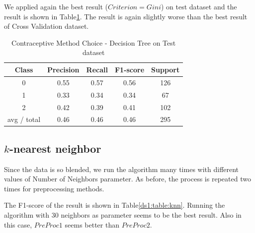 We applied again the best result ($Criterion=Gini$) on test dataset and the result is shown in Table\ref{ds1:table:decisiontree-test}. The result is again slightly worse than the best result of Cross Validation dataset.


\begin{table}[p]
\begin{center}
\begin{tabular}{|c|c|c|c|c|}
\hline Class & Precision & Recall & F1-score & Support \\

\hline 0 & 0.55 & 0.57 & 0.56 & 126\\
\hline 1 & 0.33 & 0.34 & 0.34 & 67\\
\hline 2 & 0.42 & 0.39 & 0.41 & 102\\
\hline avg / total & 0.46 & 0.46 & 0.46 & 295\\
\hline
\end{tabular}

\caption{Contraceptive Method Choice - Decision Tree on Test dataset}
\label{ds1:table:decisiontree-test}
\end{center}
\end{table}

\subsection{$k$-nearest neighbor}
Since the data is so blended, we run the algorithm many times with different values of Number of Neighbors parameter. As before, the process is repeated two times for preprocessing methods.

The F1-score of the result is shown in Table\ref{ds1:table:knn}. Running the algorithm with $30$ neighbors as parameter seems to be the best result. Also in this case, $PreProc1$ seems better than $PreProc2$.


